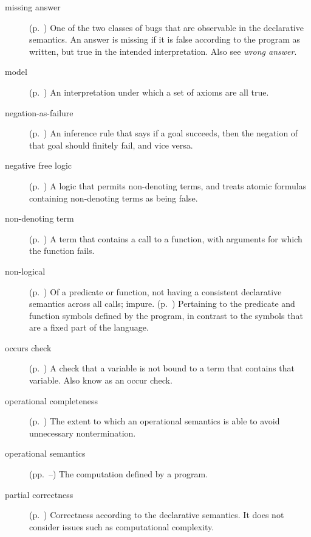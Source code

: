 \begin{description}
\item[missing answer]
(p.~\pageref{gi:missing-answer})
One of the two classes of bugs
that are observable in the declarative semantics.
An answer is missing if it is false according to the program as written,
but true in the intended interpretation.
Also see \emph{wrong answer}.

\item[model]
(p.~\pageref{gi:model})
An interpretation under which a set of axioms are all true.

\item[negation-as-failure]
(p.~\pageref{sec:naf})
An inference rule that says
if a goal succeeds, then the negation of that goal should finitely fail,
and vice versa.

\item[negative free logic]
(p.~\pageref{gi:nfl})
A logic that permits non-denoting terms,
and treats atomic formulas containing non-denoting terms as being false.

\item[non-denoting term]
(p.~\pageref{gi:non-denoting})
A term that contains a call to a  function,
with arguments for which the function fails.

\item[non-logical]
(p.~\pageref{gi:non-logical})
Of a predicate or function,
not having a consistent declarative semantics across all calls; impure.
(p.~\pageref{gi:non-logical2})
Pertaining to the predicate and function symbols defined by the program,
in contrast to the symbols that are a fixed part of the language.

\item[occurs check]
(p.~\pageref{gi:occurs-check})
A check that a variable is not bound to a term that contains that variable.
Also know as an occur check.

\item[operational completeness]
(p.~\pageref{sec:incompleteness})
The extent to which an operational semantics
is able to avoid unnecessary nontermination.

\item[operational semantics]
(pp.~\pageref{sec:op-sem}--\pageref{end:op-sem})
The computation defined by a program.

\item[partial correctness]
(p.~\pageref{gi:partial-correctness})
Correctness according to the declarative semantics.
It does not consider issues such as computational complexity.


\end{description}
